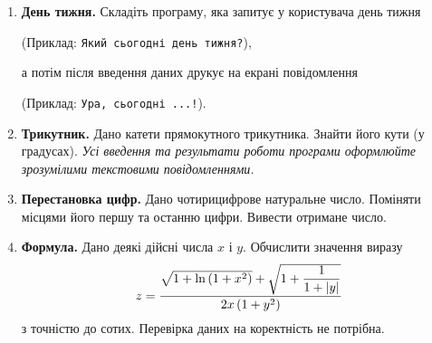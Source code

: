 \begin{enumerate}

\item \textbf{День тижня.} Складіть програму, яка запитує у користувача день тижня

(Приклад: \verb|Який сьогодні день тижня?|),

а потім після введення даних друкує на екрані повідомлення

(Приклад: \verb|Ура, сьогодні ...!|).

\item \textbf{Трикутник.} Дано катети прямокутного трикутника. Знайти його кути (у градусах).
{\itshape Усі введення та результати роботи програми оформлюйте зрозумілими текстовими повідомленнями.}

\item \textbf{Перестановка цифр.} Дано чотирицифрове натуральне число. Поміняти місцями його першу та останню цифри. Вивести отримане число.

\item \textbf{Формула.} Дано деякі дійсні числа $x$ і $y$. Обчислити значення виразу
$$
z=\dfrac{\sqrt{\mathstrut 1+\ln \left(1+x^2\right)}+\sqrt{\mathstrut 1+\dfrac{1}{1+|y|}}}{2x \,(1+y^2)}
$$
з точністю до сотих. Перевірка даних на коректність не потрібна.
\end{enumerate}




